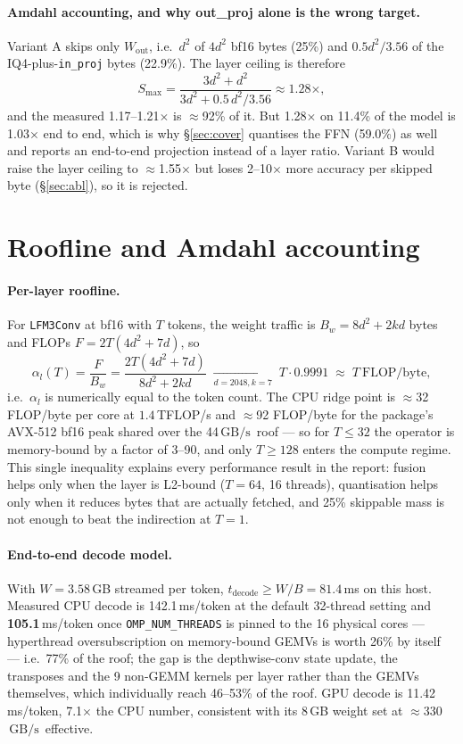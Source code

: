 \documentclass[11pt]{article}
\newcommand{\Wout}{\ensuremath{W_{\mathrm{out}}}}
\newcommand{\code}[1]{\texttt{\small #1}}
\newcommand{\gbps}{\ensuremath{\,\mathrm{GB/s}}}
\begin{document}
\paragraph{Amdahl accounting, and why out\_proj alone is the wrong target.} Variant A skips
only \Wout, i.e.\ $d^2$ of $4d^2$ bf16 bytes (25\%) and $0.5d^2/3.56$ of the
IQ4-plus-\code{in\_proj} bytes (22.9\%). The layer ceiling is therefore
\begin{equation}
S_{\max}=\frac{3d^{2}+d^{2}}{3d^{2}+0.5\,d^{2}/3.56}\approx1.28\times ,
\end{equation}
and the measured 1.17--1.21$\times$ is $\approx$92\% of it. But 1.28$\times$ on 11.4\% of
the model is 1.03$\times$ end to end, which is why \S\ref{sec:cover} quantises the FFN
(59.0\%) as well and reports an end-to-end projection instead of a layer ratio. Variant B
would raise the layer ceiling to $\approx$1.55$\times$ but loses 2--10$\times$ more
accuracy per skipped byte (\S\ref{sec:abl}), so it is rejected.

\section{Roofline and Amdahl accounting}
\paragraph{Per-layer roofline.} For \code{LFM3Conv} at bf16 with $T$ tokens, the weight
traffic is $B_w = 8d^2 + 2kd$ bytes and FLOPs $F = 2T(4d^2+7d)$, so
\begin{equation}
\alpha_l(T)=\frac{F}{B_w}=\frac{2T(4d^2+7d)}{8d^2+2kd}\;\xrightarrow[d=2048,k=7]{}\;
T\cdot 0.9991\;\approx\;T\ \text{FLOP/byte},
\end{equation}
i.e.\ $\alpha_l$ is numerically equal to the token count. The CPU ridge point is
$\approx$32 FLOP/byte per core at $1.4$\,TFLOP/s and $\approx$92 FLOP/byte for the
package's AVX-512 bf16 peak shared over the 44\gbps\ roof ---
so for $T\le 32$ the operator is memory-bound by a factor of 3--90, and only $T\ge128$
enters the compute regime. This single inequality explains every performance result in the
report: fusion helps only when the layer is L2-bound ($T{=}64$, 16 threads), quantisation
helps only when it reduces bytes that are actually fetched, and 25\% skippable mass is not
enough to beat the indirection at $T{=}1$.

\paragraph{End-to-end decode model.} With $W=3.58$\,GB streamed per token,
$t_{\mathrm{decode}}\ge W/B = 81.4$\,ms on this host. Measured CPU decode is
142.1\,ms/token at the default 32-thread setting and \textbf{105.1}\,ms/token once
\code{OMP\_NUM\_THREADS} is pinned to the 16 physical cores --- hyperthread oversubscription
on memory-bound GEMVs is worth 26\% by itself --- i.e.\ 77\% of the roof; the gap is the depthwise-conv state update, the
transposes and the 9 non-GEMM kernels per layer rather than the GEMVs themselves, which
individually reach 46--53\% of the roof. GPU decode is 11.42\,ms/token, 7.1$\times$ the
CPU number, consistent with its 8\,GB weight set at $\approx$330\gbps\ effective.
\end{document}
